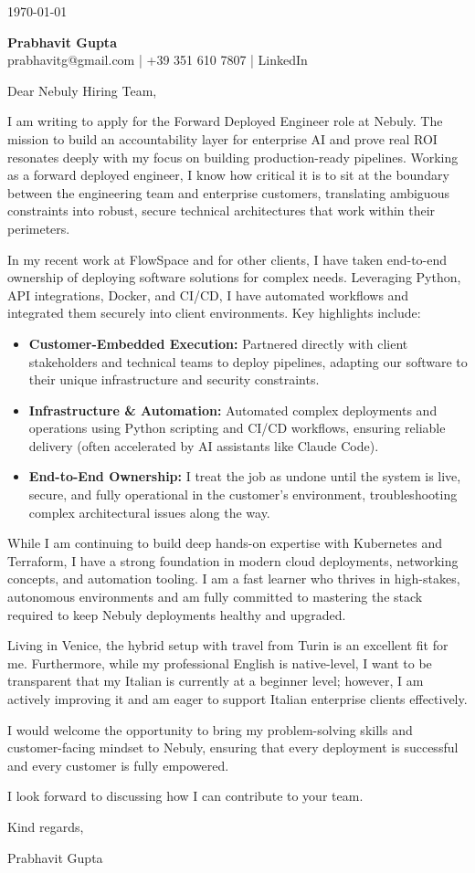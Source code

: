 \documentclass[11pt,a4paper]{article}
\begin{document}
\begin{flushright}
\today
\end{flushright}

\textbf{Prabhavit Gupta}\\
prabhavitg@gmail.com | +39 351 610 7807 | LinkedIn

Dear Nebuly Hiring Team,

I am writing to apply for the Forward Deployed Engineer role at Nebuly. The mission to build an accountability layer for enterprise AI and prove real ROI resonates deeply with my focus on building production-ready pipelines. Working as a forward deployed engineer, I know how critical it is to sit at the boundary between the engineering team and enterprise customers, translating ambiguous constraints into robust, secure technical architectures that work within their perimeters.

In my recent work at FlowSpace and for other clients, I have taken end-to-end ownership of deploying software solutions for complex needs. Leveraging Python, API integrations, Docker, and CI/CD, I have automated workflows and integrated them securely into client environments. Key highlights include:

\begin{itemize}
    \item \textbf{Customer-Embedded Execution:} Partnered directly with client stakeholders and technical teams to deploy pipelines, adapting our software to their unique infrastructure and security constraints.
    \item \textbf{Infrastructure \& Automation:} Automated complex deployments and operations using Python scripting and CI/CD workflows, ensuring reliable delivery (often accelerated by AI assistants like Claude Code).
    \item \textbf{End-to-End Ownership:} I treat the job as undone until the system is live, secure, and fully operational in the customer's environment, troubleshooting complex architectural issues along the way.
\end{itemize}

While I am continuing to build deep hands-on expertise with Kubernetes and Terraform, I have a strong foundation in modern cloud deployments, networking concepts, and automation tooling. I am a fast learner who thrives in high-stakes, autonomous environments and am fully committed to mastering the stack required to keep Nebuly deployments healthy and upgraded. 

Living in Venice, the hybrid setup with travel from Turin is an excellent fit for me. Furthermore, while my professional English is native-level, I want to be transparent that my Italian is currently at a beginner level; however, I am actively improving it and am eager to support Italian enterprise clients effectively.

I would welcome the opportunity to bring my problem-solving skills and customer-facing mindset to Nebuly, ensuring that every deployment is successful and every customer is fully empowered.

I look forward to discussing how I can contribute to your team.

\vspace{1em}
Kind regards,

Prabhavit Gupta
\end{document}

